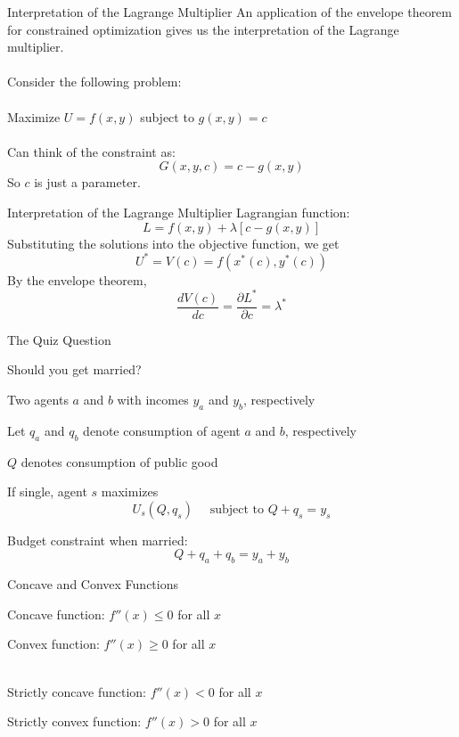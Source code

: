 \documentclass{./../../Latex/teaching_slides}
\begin{document}
\begin{frame}{Interpretation of the Lagrange Multiplier}
An application of the envelope theorem for constrained optimization gives us the interpretation of the Lagrange multiplier. \\~\\
Consider the following problem: \\~\\
\hspace{1em} Maximize $U=f(x, y)$ subject to $g(x, y)=c$ \\~\\
Can think of the constraint as:
$$ G(x,y,c)= c-g(x,y) $$
So $c$ is just a parameter. 
\end{frame}

\begin{frame}{Interpretation of the Lagrange Multiplier}
Lagrangian function:
$$
L=f(x, y )+\lambda [c-g(x, y)]
$$
Substituting the solutions into the objective function, we get
$$
U^{*}=V(c) = f(x^{*}(c), y^{*}(c))
$$
By the envelope theorem,
$$
\frac{d V(c)}{d c}=\frac{\partial L^{*}}{\partial c}=\lambda^*
$$
\end{frame}

\begin{frame}{The Quiz Question}
\end{frame}

\begin{frame}{Should you get married?}
\vspace{-0.25em}
\begin{witemize}
  \item Two agents $a$ and $b$ with incomes $y_a$ and $y_b$, respectively
  \item Let $q_a$ and $q_b$ denote consumption of agent $a$ and $b$, respectively
  \item $Q$ denotes consumption of public good 
  \item If single, agent $s$ maximizes $$ U_s(Q, q_s) \quad \text{ subject to } Q + q_s = y_s $$ 
  \item Budget constraint when married: $$ Q + q_a + q_b = y_a + y_b    $$
\end{witemize}
\end{frame}


\begin{frame}{Concave and Convex Functions}
\begin{witemize}
  \item Concave function: $ f''(x) \leq 0$ for all $x$ 
  \item Convex function: $ f''(x) \geq 0$ for all $x$ \\~\\
  \item Strictly concave function: $ f''(x) < 0$ for all $x$ 
  \item Strictly convex function: $ f''(x) > 0$ for all $x$ 
\end{witemize}
\end{frame}
\end{document}
